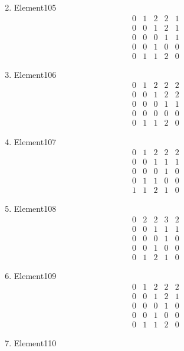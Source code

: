 \documentclass[12pt]{article}
\begin{document}
\begin{multicols}{3}
\begin{enumerate}
\begin{equation*}
\end{equation*}
\item Element105
\begin{equation*}
\begin{array}{ccccc}
0&1&2&2&1\\
0&0&1&2&1\\
0&0&0&1&1\\
0&0&1&0&0\\
0&1&1&2&0
\end{array}
\end{equation*}
\item Element106
\begin{equation*}
\begin{array}{ccccc}
0&1&2&2&2\\
0&0&1&2&2\\
0&0&0&1&1\\
0&0&0&0&0\\
0&1&1&2&0
\end{array}
\end{equation*}
\item Element107
\begin{equation*}
\begin{array}{ccccc}
0&1&2&2&2\\
0&0&1&1&1\\
0&0&0&1&0\\
0&1&1&0&0\\
1&1&2&1&0
\end{array}
\end{equation*}
\item Element108
\begin{equation*}
\begin{array}{ccccc}
0&2&2&3&2\\
0&0&1&1&1\\
0&0&0&1&0\\
0&0&1&0&0\\
0&1&2&1&0
\end{array}
\end{equation*}
\item Element109
\begin{equation*}
\begin{array}{ccccc}
0&1&2&2&2\\
0&0&1&2&1\\
0&0&0&1&0\\
0&0&1&0&0\\
0&1&1&2&0
\end{array}
\end{equation*}
\item Element110

\end{enumerate}
\end{multicols}
\end{document}
